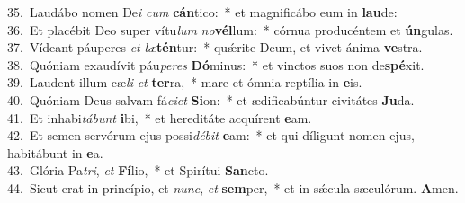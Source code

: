 {35.~}Laudábo nomen De\textit{i} \textit{cum} \textbf{cán}tico:~* et magnificábo eum in \textbf{lau}de:\\
{36.~}Et placébit Deo super vítu\textit{lum} \textit{no}\textbf{vél}lum:~* córnua producéntem et \textbf{ún}gulas.\\
{37.~}Vídeant páuperes \textit{et} \textit{læ}\textbf{tén}tur:~* quǽrite Deum, et vivet ánima \textbf{ve}stra.\\
{38.~}Quóniam exaudívit páu\textit{pe}\textit{res} \textbf{Dó}minus:~* et vinctos suos non de\textbf{spé}xit.\\
{39.~}Laudent illum cæ\textit{li} \textit{et} \textbf{ter}ra,~* mare et ómnia reptília in \textbf{e}is.\\
{40.~}Quóniam Deus salvam fá\textit{ci}\textit{et} \textbf{Si}on:~* et ædificabúntur civitátes \textbf{Ju}da.\\
{41.~}Et inhabi\textit{tá}\textit{bunt} \textbf{i}bi,~* et hereditáte acquírent \textbf{e}am.\\
{42.~}Et semen servórum ejus possi\textit{dé}\textit{bit} \textbf{e}am:~* et qui díligunt nomen ejus, habitábunt in \textbf{e}a.\\
{43.~}Glória Pa\textit{tri}, \textit{et} \textbf{Fí}lio,~* et Spirítui \textbf{San}cto.\\
{44.~}Sicut erat in princípio, et \textit{nunc}, \textit{et} \textbf{sem}per,~* et in sǽcula sæculórum. \textbf{A}men.\\
